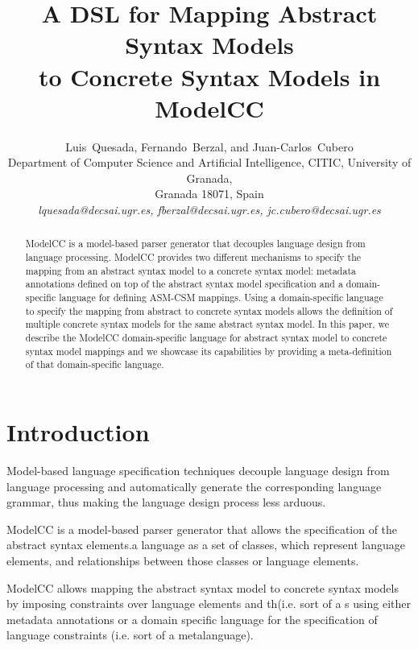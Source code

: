 \documentclass[floatfix,rmp,twocolumn,twoside]{revtex4}
\begin{document}
\title{A DSL for Mapping Abstract Syntax Models \\ to Concrete Syntax Models in ModelCC}
\author{Luis~Quesada, Fernando~Berzal, and Juan-Carlos~Cubero\\
  Department of Computer Science and Artificial Intelligence, CITIC, University of Granada, \\
  Granada 18071, Spain \\
  \textit{lquesada@decsai.ugr.es, fberzal@decsai.ugr.es, jc.cubero@decsai.ugr.es}
  }


\begin{abstract}
ModelCC is a model-based parser generator that decouples language design from language processing.
ModelCC provides two different mechanisms to specify the mapping from an abstract syntax model to a concrete syntax model: metadata annotations defined on top of the abstract syntax model specification and a domain-specific language for defining ASM-CSM mappings.
Using a domain-specific language to specify the mapping from abstract to concrete syntax models allows the definition of multiple concrete syntax models for the same abstract syntax model.
In this paper, we describe the ModelCC domain-specific language for abstract syntax model to concrete syntax model mappings and we showcase its capabilities by providing a meta-definition of that domain-specific language.
\end{abstract}

\maketitle
\section{Introduction} \label{sec:introduction}

\noindent Model-based language specification techniques \cite{Kleppe2007} decouple language design from language processing and automatically generate the corresponding language grammar, thus making the language design process less arduous.

ModelCC \cite{Quesada2011c,Quesada2012k} is a model-based parser generator that allows the specification of the abstract syntax elements.a language as a set of classes, which represent language elements, and relationships between those classes or language elements.

ModelCC allows mapping the abstract syntax model to concrete syntax models by imposing constraints over language elements and th(i.e. sort of a s using either metadata annotations or a domain specific language for the specification of language constraints (i.e. sort of a metalanguage).
\end{document}
